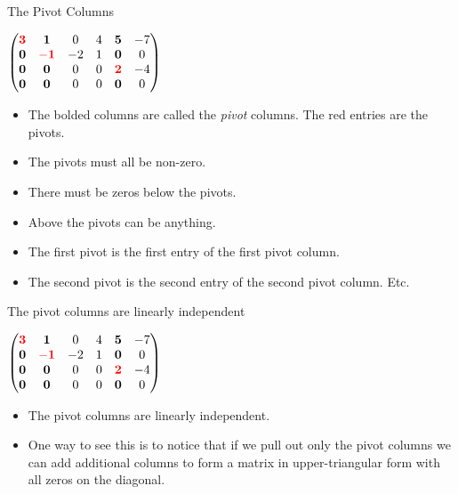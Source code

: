 \documentclass{beamer}
\begin{document}

\begin{frame}{The Pivot Columns}

$
\begin{pmatrix}
\textcolor{red}{\mathbf{3}} & \mathbf{1}                   &  0  & 4 & \mathbf{5}                  & -7 \\
\mathbf{0}                  & \textcolor{red}{\mathbf{-1}} & -2  & 1 & \mathbf{0}                  & 0  \\
\mathbf{0}                  & \mathbf{0}                   &  0  & 0 & \textcolor{red}{\mathbf{2}} & -4 \\
\mathbf{0}                  & \mathbf{0}                   &  0  & 0 & \mathbf{0}                  & 0  \\
\end{pmatrix}
$
\begin{itemize}
\item The bolded columns are called the \emph{pivot} columns. The red entries are the pivots.
\item The pivots must all be non-zero.
\item There must be zeros below the pivots.
\item Above the pivots can be anything.
\item The first pivot is the first entry of the first pivot column.
\item The second pivot is the second entry of the second pivot column. Etc.
\end{itemize}

\end{frame}


\begin{frame}{The pivot columns are linearly independent}

$
\begin{pmatrix}
\textcolor{red}{\mathbf{3}} & \mathbf{1}                   &  0  & 4 & \mathbf{5}                  & -7 \\
\mathbf{0}                  & \textcolor{red}{\mathbf{-1}} & -2  & 1 & \mathbf{0}                  & 0  \\
\mathbf{0}                  & \mathbf{0}                   &  0  & 0 & \textcolor{red}{\mathbf{2}} & -4 \\
\mathbf{0}                  & \mathbf{0}                   &  0  & 0 & \mathbf{0}                  & 0  \\
\end{pmatrix}
$
\begin{itemize}
\item The pivot columns are linearly independent.
\item One way to see this is to notice that if we pull out only the pivot columns
we can add additional columns to form a matrix in upper-triangular form with all zeros on the diagonal.
\end{itemize}

\end{frame}
\end{document}
